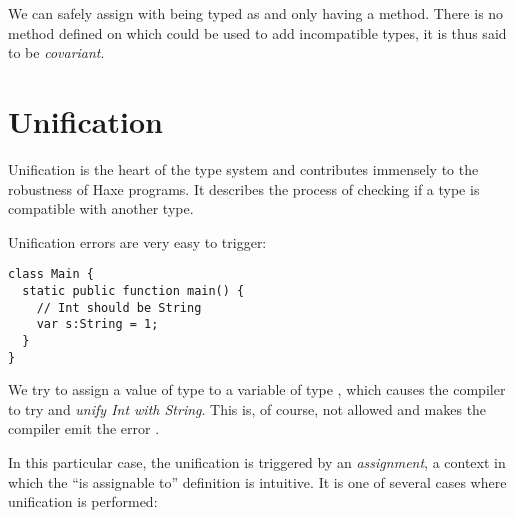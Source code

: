 
We can safely assign with  being typed as  and  only having a  method. There is no method defined on  which could be used to add incompatible types, it is thus said to be \emph{covariant}.






\section{Unification}
\label{type-system-unification}


Unification is the heart of the type system and contributes immensely to the robustness of Haxe programs. It describes the process of checking if a type is compatible with another type.


Unification errors are very easy to trigger:

\begin{lstlisting}
class Main {
  static public function main() {
    // Int should be String
    var s:String = 1;
  }
}
\end{lstlisting}
We try to assign a value of type  to a variable of type , which causes the compiler to try and \emph{unify Int with String}. This is, of course, not allowed and makes the compiler emit the error .

In this particular case, the unification is triggered by an \emph{assignment}, a context in which the ``is assignable to'' definition is intuitive. It is one of several cases where unification is performed:

